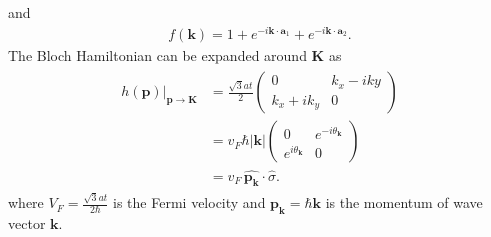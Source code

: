 \documentclass[10pt, oneside]{article}
\newcommand{\te}{\theta}
\newcommand{\p}[1]{\left(#1\right)}
\begin{document}
and 
\begin{align}
	f\left( \bm{k} \right) = 1+ e^{-i \bm{k} \cdot \bm{a}_{1}} + e^{-i \bm{k} \cdot \bm{a}_{2}}.
\end{align}
The Bloch Hamiltonian can be expanded around \(\bm{K}\) as 
\begin{align}
	\begin{split}
		h\p{\bm{p}}\left. \bigg| \right._{\bm{p} \rightarrow \bm{K}} & = \frac{\sqrt{3} a t}{2} \begin{pmatrix}
			0 & k_{x} - i k{y} \\
			k_{x} + i k_{y} & 0
		\end{pmatrix} \\
		& = v_{F} \hbar |\bm{k}| \begin{pmatrix}
			0 & e^{-i \te_{\bm{k}}} \\
			e^{i \te_{\bm{k}}} & 0
		\end{pmatrix} \\
		& = v_{F} \, \hat{\bm{p}_{\bm{k}}} \cdot \hat{\sigma}.
	\end{split}
\end{align}
where \(V_{F} =  \frac{\sqrt{3} a t}{2 \hbar}\) is the Fermi velocity and \(\bm{p}_{\bm{k}} = \hbar \bm{k}\) is the momentum of wave vector \(\bm{k}\).
\end{document}
